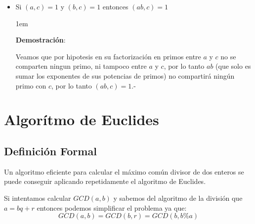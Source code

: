 \documentclass[12pt, fleqn]{report}                             %
\newenvironment{SmallIndentation}[1][0.75em]                    %
    {\begin{adjustwidth}{#1}{}\begin{footnotesize}}                 %
    {\end{footnotesize}\end{adjustwidth}}                           %
\begin{document}
\begin{itemize}
\begin{SmallIndentation}[1em]
                    \end{SmallIndentation}

                \item Si $(a, c) = 1$ y $(b, c) = 1$ entonces $(ab, c) = 1$

                    \begin{SmallIndentation}[1em]
                        \textbf{Demostración}:

                        Veamos que por hipotesis en  su factorización en primos entre $a$ y $c$
                        no se comparten ningun primo, ni tampoco entre $a$ y $c$, por lo tanto
                        $ab$ (que solo es sumar los exponentes de sus potencias de primos)
                        no compartirá ningún primo con $c$, por lo tanto $(ab, c) = 1$.-

                    \end{SmallIndentation}  

            \end{itemize}




    \clearpage
    \section{Algorítmo de Euclides}

        \subsection*{Definición Formal}

            Un algoritmo eficiente para calcular el máximo común divisor de dos enteros
            se puede conseguir aplicando repetidamente el algoritmo de Euclides.

            Si intentamos calcular $GCD(a,b)$ y sabemos del algoritmo de la división 
            que $a=bq+r$ entonces podemos simplificar el problema ya que:
            \begin{equation}
                GCD(a,b) = GCD(b,r) = GCD(b, b\%a)
            \end{equation}
\end{document}
